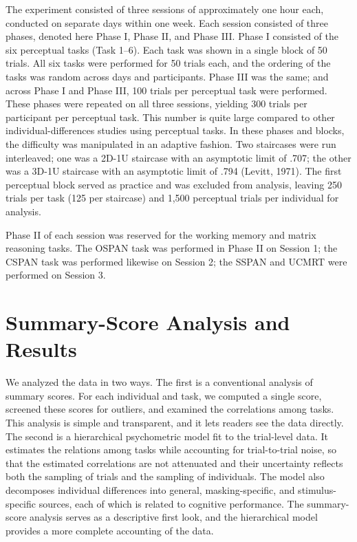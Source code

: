 \documentclass[
  ,man]{apa6}
\begin{document}
The experiment consisted of three sessions of approximately one hour each, conducted on separate days within one week. Each session consisted of three phases, denoted here Phase I, Phase II, and Phase III. Phase I consisted of the six perceptual tasks (Task 1--6). Each task was shown in a single block of 50 trials. All six tasks were performed for 50 trials each, and the ordering of the tasks was random across days and participants. Phase III was the same; and across Phase I and Phase III, 100 trials per perceptual task were performed. These phases were repeated on all three sessions, yielding 300 trials per participant per perceptual task. This number is quite large compared to other individual-differences studies using perceptual tasks. In these phases and blocks, the difficulty was manipulated in an adaptive fashion. Two staircases were run interleaved; one was a 2D-1U staircase with an asymptotic limit of .707; the other was a 3D-1U staircase with an asymptotic limit of .794 (Levitt, 1971). The first perceptual block served as practice and was excluded from analysis, leaving 250 trials per task (125 per staircase) and 1,500 perceptual trials per individual for analysis.

Phase II of each session was reserved for the working memory and matrix reasoning tasks. The OSPAN task was performed in Phase II on Session 1; the CSPAN task was performed likewise on Session 2; the SSPAN and UCMRT were performed on Session 3.

\section{Summary-Score Analysis and Results}\label{summary-score-analysis-and-results}

We analyzed the data in two ways. The first is a conventional analysis of summary scores. For each individual and task, we computed a single score, screened these scores for outliers, and examined the correlations among tasks. This analysis is simple and transparent, and it lets readers see the data directly. The second is a hierarchical psychometric model fit to the trial-level data. It estimates the relations among tasks while accounting for trial-to-trial noise, so that the estimated correlations are not attenuated and their uncertainty reflects both the sampling of trials and the sampling of individuals. The model also decomposes individual differences into general, masking-specific, and stimulus-specific sources, each of which is related to cognitive performance. The summary-score analysis serves as a descriptive first look, and the hierarchical model provides a more complete accounting of the data.
\end{document}
